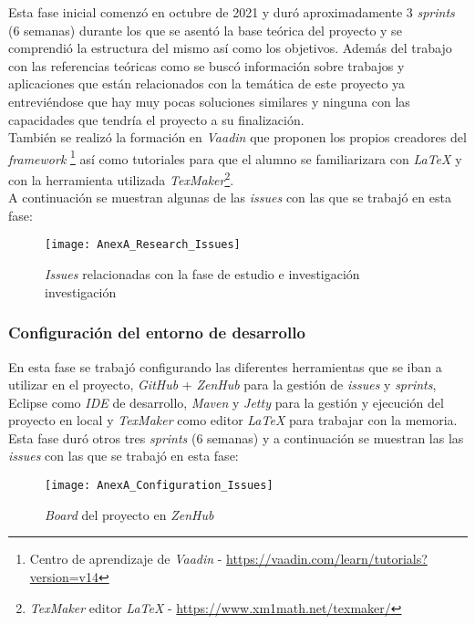 Esta fase inicial comenzó en octubre de 2021 y duró aproximadamente 3 \textit{sprints} (6 semanas) durante los que se asentó la base teórica del proyecto y se comprendió la estructura del mismo así como los objetivos. Además del trabajo con las referencias teóricas como \cite{ratzinger_space:_2007} se buscó información sobre trabajos y aplicaciones que están relacionados con la temática de este proyecto ya entreviéndose que hay muy pocas soluciones similares y ninguna con las capacidades que tendría el proyecto a su finalización.\\
También se realizó la formación en \textit{Vaadin} que proponen los propios creadores del \textit{framework} \footnote{Centro de aprendizaje de \textit{Vaadin} - \url{https://vaadin.com/learn/tutorials?version=v14}} así como tutoriales para que el alumno se familiarizara con \textit{LaTeX} y con la herramienta utilizada \textit{TexMaker}\footnote{\textit{TexMaker} editor \textit{LaTeX} - \url{https://www.xm1math.net/texmaker/}}.\\

A continuación se muestran algunas de las \textit{issues} con las que se trabajó en esta fase:

\begin{figure}[!h]
	\centering
	\texttt{[image: AnexA\_Research\_Issues]}
	\caption{\textit{Issues} relacionadas con la fase de estudio e investigación investigación}
	\label{fig:AnexA_Research_Issues}
\end{figure}
\FloatBarrier

\subsubsection{Configuración del entorno de desarrollo}

En esta fase se trabajó configurando las diferentes herramientas que se iban a utilizar en el proyecto, \textit{GitHub} + \textit{ZenHub} para la gestión de \textit{issues} y \textit{sprints}, Eclipse como \textit{IDE} de desarrollo, \textit{Maven} y \textit{Jetty} para la gestión y ejecución del proyecto en local y \textit{TexMaker} como editor \textit{LaTeX} para trabajar con la memoria. Esta fase duró otros tres \textit{sprints} (6 semanas) y a continuación se muestran las las \textit{issues} con las que se trabajó en esta fase:

\begin{figure}[!h]
	\centering
	\texttt{[image: AnexA\_Configuration\_Issues]}
	\caption{\textit{Board} del proyecto en \textit{ZenHub}}
	\label{fig:AnexA_Configuration_Issues}
\end{figure}
\FloatBarrier

